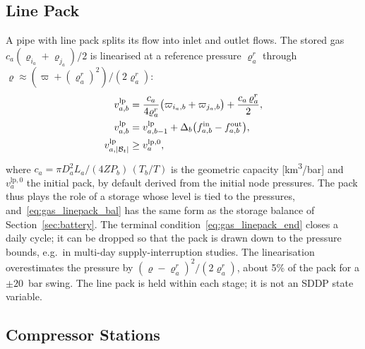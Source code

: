 \subsection{Line Pack}
\label{sec:gas_linepack}

A pipe with line pack splits its flow into inlet and outlet flows.  The
stored gas $c_a(\varrho_{i_a} + \varrho_{j_a})/2$ is linearised at a
reference pressure $\varrho^{r}_a$ through
$\varrho \approx (\varpi + (\varrho^{r}_a)^2)/(2\varrho^{r}_a)$:
\begin{align}
v^{\mathrm{lp}}_{a,b}
  &= \frac{c_a}{4\varrho^{r}_a}\bigl(\varpi_{i_a,b} + \varpi_{j_a,b}\bigr)
   + \frac{c_a\,\varrho^{r}_a}{2},
   \label{eq:gas_linepack_def} \\
v^{\mathrm{lp}}_{a,b}
  &= v^{\mathrm{lp}}_{a,b-1}
   + \Delta_b\bigl(f^{\mathrm{in}}_{a,b} - f^{\mathrm{out}}_{a,b}\bigr),
   \label{eq:gas_linepack_bal} \\
v^{\mathrm{lp}}_{a,|\mathcal{B}_t|} &\geq v^{\mathrm{lp},0}_a ,
   \label{eq:gas_linepack_end}
\end{align}
where $c_a = \pi D_a^2 L_a/(4 Z P_b)\,(T_b/T)$ is the geometric
capacity [km\textsuperscript{3}/bar] and $v^{\mathrm{lp},0}_a$ the
initial pack, by default derived from the initial node pressures.  The
pack thus plays the role of a storage whose level is tied to the
pressures, and~\eqref{eq:gas_linepack_bal} has the same form as the
storage balance of Section~\ref{sec:battery}.  The terminal
condition~\eqref{eq:gas_linepack_end} closes a daily cycle; it can be
dropped so that the pack is drawn down to the pressure bounds, e.g.\ in
multi-day supply-interruption studies.  The linearisation overestimates
the pressure by $(\varrho - \varrho^{r}_a)^2/(2\varrho^{r}_a)$, about
5\% of the pack for a $\pm 20$~bar swing.  The line pack is held
within each stage; it is not an SDDP state variable.

\subsection{Compressor Stations}

